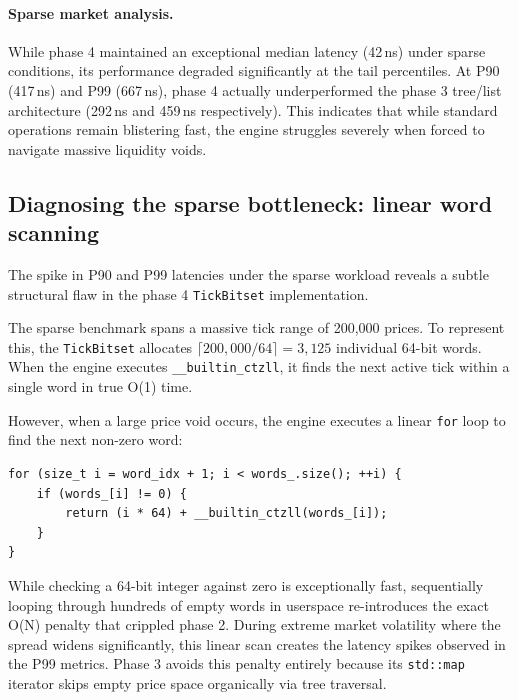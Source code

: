 \documentclass[11pt,a4paper]{article}
\begin{document}
\paragraph{Sparse market analysis.} While phase 4 maintained an exceptional
median latency (42\,ns) under sparse conditions, its performance degraded
significantly at the tail percentiles. At P90 (417\,ns) and P99 (667\,ns),
phase 4 actually underperformed the phase 3 tree/list architecture (292\,ns
and 459\,ns respectively). This indicates that while standard operations
remain blistering fast, the engine struggles severely when forced to
navigate massive liquidity voids.

\subsection{Diagnosing the sparse bottleneck: linear word scanning}

The spike in P90 and P99 latencies under the sparse workload reveals a
subtle structural flaw in the phase 4 \texttt{TickBitset} implementation.

The sparse benchmark spans a massive tick range of 200{,}000 prices. To
represent this, the \texttt{TickBitset} allocates
$\lceil 200{,}000/64 \rceil = 3{,}125$ individual 64-bit words. When the
engine executes \texttt{\_\_builtin\_ctzll}, it finds the next active tick
within a single word in true O(1) time.

However, when a large price void occurs, the engine executes a linear
\texttt{for} loop to find the next non-zero word:

\begin{lstlisting}[caption={The bottleneck: linear scanning over bitmask
words (phase 4)}]
for (size_t i = word_idx + 1; i < words_.size(); ++i) {
    if (words_[i] != 0) {
        return (i * 64) + __builtin_ctzll(words_[i]);
    }
}
\end{lstlisting}

While checking a 64-bit integer against zero is exceptionally fast,
sequentially looping through hundreds of empty words in userspace
re-introduces the exact O(N) penalty that crippled phase 2. During extreme
market volatility where the spread widens significantly, this linear scan
creates the latency spikes observed in the P99 metrics. Phase 3 avoids this
penalty entirely because its \texttt{std::map} iterator skips empty price
space organically via tree traversal.
\end{document}
